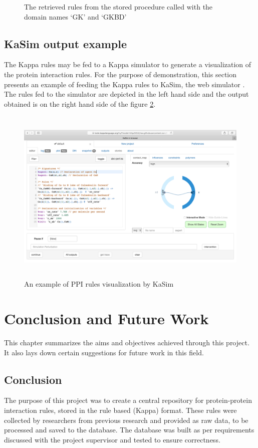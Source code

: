 \documentclass[msc,deptreport,ai]{infthesis}      %
\begin{document}
\begin{enumerate}
\begin{figure}[H]
		\caption{The retrieved rules from the stored procedure called with the domain names `GK' and `GKBD'}
		\label{fig:CorrectnessDomainName2}		
	\end{figure}	
\end{enumerate}

\section{KaSim output example}
The Kappa rules may be fed to a Kappa simulator to generate a visualization of the protein interaction rules. For the purpose of demonstration, this section presents an example of feeding the Kappa rules to KaSim, the web simulator \cite{KaSimBrowser}. The rules fed to the simulator are depicted in the left hand side and the output obtained is on the right hand side of the figure \ref{fig:kappaOutput}. 
	\begin{figure}[H]
	\centering
	\captionsetup{justification=centering}
	\includegraphics[width=\linewidth,height=8.5cm,keepaspectratio]{KasimOutput}	
	\caption{An example of PPI rules visualization by KaSim \cite{KaSimBrowser}}
	\label{fig:kappaOutput}		
\end{figure}	

\chapter{Conclusion and Future Work}
This chapter summarizes the aims and objectives achieved through this project. It also lays down certain suggestions for future work in this field.

\section{Conclusion}
The purpose of this project was to create a central repository for protein-protein interaction rules, stored in the rule based (Kappa) format. These rules were collected by researchers from previous research and provided as raw data, to be processed and saved to the database. The database was built as per requirements discussed with the project supervisor and tested to ensure correctness. 
\end{document}
